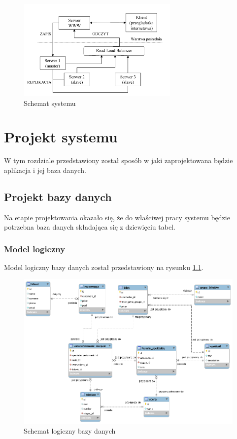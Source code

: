 \documentclass{mgr}
\begin{document}
\begin{figure}[!ht]
	\centering
	\includegraphics[width=0.7\textwidth]{images/struktura_systemu.png}
	\caption{Schemat systemu}
	\label{fig:system-diagram}
\end{figure}

\chapter{Projekt systemu}
W tym rozdziale przedstawiony został sposób w jaki zaprojektowana będzie aplikacja i jej baza danych.

\section{Projekt bazy danych}
Na etapie projektowania okazało się, że do właściwej pracy systemu będzie potrzebna baza danych składająca się z dziewięciu tabel.

\subsection{Model logiczny}
Model logiczny bazy danych został przedstawiony na rysunku \ref{fig:logical-data-model}.

\begin{figure}[!ht]
	\centering
	\includegraphics[width=\textwidth]{images/logiczny.png}
	\caption{Schemat logiczny bazy danych}
	\label{fig:logical-data-model}
\end{figure}
\end{document}
